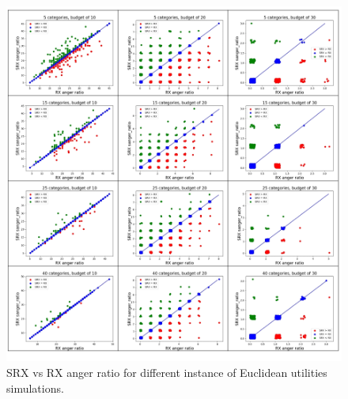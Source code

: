 \documentclass[runningheads]{llncs}
\begin{document}
\begin{subappendices}
\begin{figure}[t]
\begin{center}
\includegraphics[width=14cm]{simulation/unit_scatters_ar.png}
\caption{SRX vs RX anger ratio for different instance of Euclidean utilities simulations.
}\label{fig:scatter_all_ar1}
\end{center}
\end{figure}


\end{subappendices}
\end{document}
